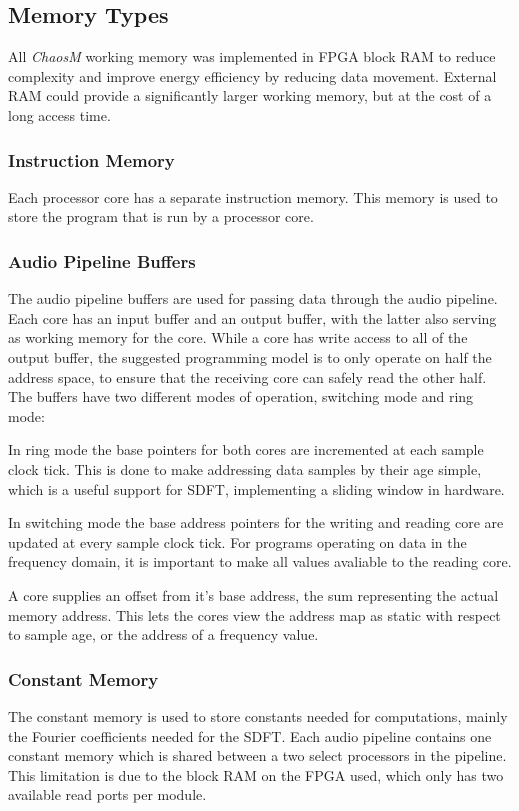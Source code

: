 
\subsection{Memory Types}\label{subsec:fpga-memory}

All \textit{ChaosM} working memory was implemented in FPGA block RAM to reduce complexity
and improve energy efficiency by reducing data movement. External RAM could
provide a significantly larger working memory, but at the cost of a long access time.

\subsubsection{Instruction Memory}
Each processor core has a separate instruction memory. This memory is used to
store the program that is run by a processor core.

\subsubsection{Audio Pipeline Buffers}
The audio pipeline buffers are used for passing data through the audio pipeline.
Each core has an input buffer and an output buffer, with the latter also serving
as working memory for the core. While a core has write access to all of the
output buffer, the suggested programming model is to only operate on half the
address space, to ensure that the receiving core can safely read the other half.
The buffers have two different modes of operation, switching mode and ring mode:

In ring mode the base pointers for both cores are incremented at each sample
clock tick. This is done to make addressing data samples by their age simple,
which is a useful support for SDFT\cite{appendix:SDFT}, implementing a sliding
window in hardware.

In switching mode the base address pointers for the writing and reading core are
updated at every sample clock tick. For programs operating on data in the
frequency domain, it is important to make all values avaliable to the reading core.

A core supplies an offset from it's base address, the sum representing the
actual memory address. This lets the cores view the address map as static with
respect to sample age, or the address of a frequency value.


\subsubsection{Constant Memory}
The constant memory is used to store constants needed for computations, mainly
the Fourier coefficients needed for the SDFT. Each audio pipeline contains one
constant memory which is shared between a two select processors in the
pipeline. This limitation is due to the block RAM on the FPGA used, which only
has two available read ports per module.

